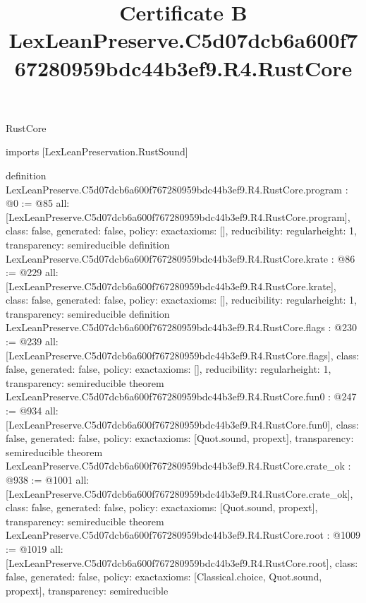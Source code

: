 \begin{lexlean}{RustCore}
\title{Certificate B LexLeanPreserve.C5d07dcb6a600f767280959bdc44b3ef9.R4.RustCore}
\begin{coremodule}
imports [LexLeanPreservation.RustSound]

definition LexLeanPreserve.C5d07dcb6a600f767280959bdc44b3ef9.R4.RustCore.program : @0 := @85 {
  all: [LexLeanPreserve.C5d07dcb6a600f767280959bdc44b3ef9.R4.RustCore.program],
  class: false,
  generated: false,
  policy: exact{axioms: []},
  reducibility: regular{height: 1},
  transparency: semireducible
}
definition LexLeanPreserve.C5d07dcb6a600f767280959bdc44b3ef9.R4.RustCore.krate : @86 := @229 {
  all: [LexLeanPreserve.C5d07dcb6a600f767280959bdc44b3ef9.R4.RustCore.krate],
  class: false,
  generated: false,
  policy: exact{axioms: []},
  reducibility: regular{height: 1},
  transparency: semireducible
}
definition LexLeanPreserve.C5d07dcb6a600f767280959bdc44b3ef9.R4.RustCore.flags : @230 := @239 {
  all: [LexLeanPreserve.C5d07dcb6a600f767280959bdc44b3ef9.R4.RustCore.flags],
  class: false,
  generated: false,
  policy: exact{axioms: []},
  reducibility: regular{height: 1},
  transparency: semireducible
}
theorem LexLeanPreserve.C5d07dcb6a600f767280959bdc44b3ef9.R4.RustCore.fun0 : @247 := @934 {
  all: [LexLeanPreserve.C5d07dcb6a600f767280959bdc44b3ef9.R4.RustCore.fun0],
  class: false,
  generated: false,
  policy: exact{axioms: [Quot.sound, propext]},
  transparency: semireducible
}
theorem LexLeanPreserve.C5d07dcb6a600f767280959bdc44b3ef9.R4.RustCore.crate_ok : @938 := @1001 {
  all: [LexLeanPreserve.C5d07dcb6a600f767280959bdc44b3ef9.R4.RustCore.crate_ok],
  class: false,
  generated: false,
  policy: exact{axioms: [Quot.sound, propext]},
  transparency: semireducible
}
theorem LexLeanPreserve.C5d07dcb6a600f767280959bdc44b3ef9.R4.RustCore.root : @1009 := @1019 {
  all: [LexLeanPreserve.C5d07dcb6a600f767280959bdc44b3ef9.R4.RustCore.root],
  class: false,
  generated: false,
  policy: exact{axioms: [Classical.choice, Quot.sound, propext]},
  transparency: semireducible
}


\end{coremodule}
\end{lexlean}
